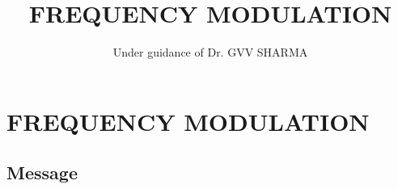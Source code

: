 \documentclass[12pt]{book}
\renewcommand\thesection{\arabic{section}}
\begin{document}
\let\StandardTheFigure\thefigure
\let\StandardTheFigure\thefigure
\let\StandardTheTable\thetable
\let\vec\mathbf
\def\putbox#1#2#3{\makebox[0in][l]{\makebox[#1][l]{}\raisebox{\baselineskip}[0in][0in]{\raisebox{#2}[0in][0in]{#3}}}}
     \def\rightbox#1{\makebox[0in][r]{#1}}
     \def\centbox#1{\makebox[0in]{#1}}
     \def\topbox#1{\raisebox{-\baselineskip}[0in][0in]{#1}}
     \def\midbox#1{\raisebox{-0.5\baselineskip}[0in][0in]{#1}}
\title{ 
FREQUENCY MODULATION
}
\author{ Under guidance of Dr. GVV SHARMA}%
\maketitle
\tableofcontents

\chapter{FREQUENCY MODULATION}
\section{Message}
\end{document}
